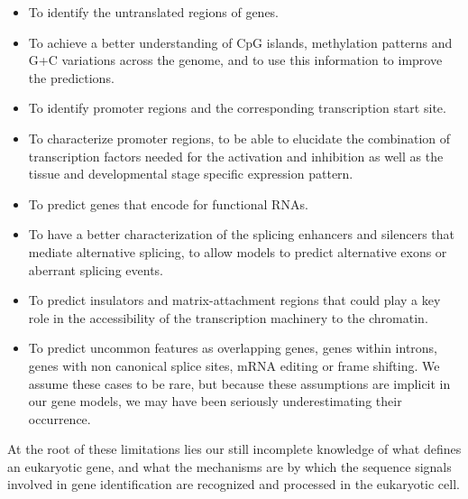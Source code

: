 \begin{itemize}

\item To identify the untranslated regions of genes. 

\item To achieve a better understanding of CpG islands, methylation 
patterns and G+C variations across the genome, and to use this
information to improve the predictions.

\item To identify promoter regions and the corresponding transcription 
start site.

\item To characterize promoter regions, to be able to elucidate 
the combination of transcription factors needed for the activation and
inhibition as well as the tissue and developmental stage specific
expression pattern.

\item To predict genes that encode for functional RNAs.

\item To have a better characterization of the splicing enhancers and 
silencers that mediate alternative splicing, to allow models to
predict alternative exons or aberrant splicing events.

\item To predict insulators and matrix-attachment regions that could 
play a key role in the accessibility of the transcription machinery to
the chromatin.

\item To predict uncommon features as overlapping genes, genes within 
introns, genes with non canonical splice sites, mRNA editing or frame
shifting. We assume these cases to be rare, but because these
assumptions are implicit in our gene models, we may have been
seriously underestimating their occurrence.

\end{itemize}

At the root of these limitations lies our still incomplete knowledge
of what defines an eukaryotic gene, and what the mechanisms are by
which the sequence signals involved in gene identification are
recognized and processed in the eukaryotic cell.


